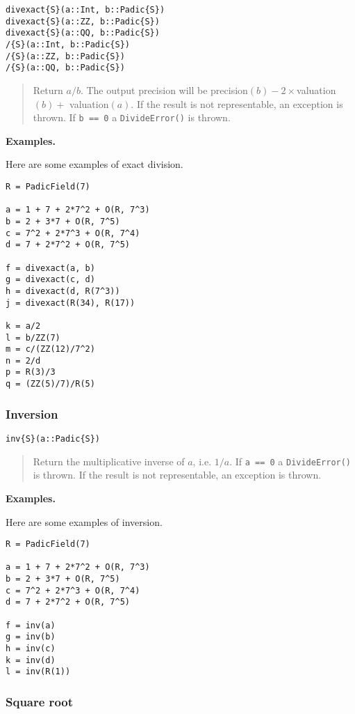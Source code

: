 \documentclass[a4paper,10pt]{article}
\newcommand{\code}{\lstinline}
\newcommand{\desc}[1]{\vspace{-3mm}\begin{quote}#1\end{quote}}
\begin{document}
{{\begin{lstlisting}
divexact{S}(a::Int, b::Padic{S})
divexact{S}(a::ZZ, b::Padic{S})
divexact{S}(a::QQ, b::Padic{S})
/{S}(a::Int, b::Padic{S})
/{S}(a::ZZ, b::Padic{S})
/{S}(a::QQ, b::Padic{S})
\end{lstlisting}

\desc{Return $a/b$. The output precision will be 
precision$(b) - 2\times$valuation$(b) +$ valuation$(a)$. If the result is not
representable, an exception is thrown. If \code{b == 0} a \code{DivideError()}
is thrown.}

\textbf{Examples.}

Here are some examples of exact division.

\begin{lstlisting}
R = PadicField(7)

a = 1 + 7 + 2*7^2 + O(R, 7^3)
b = 2 + 3*7 + O(R, 7^5)
c = 7^2 + 2*7^3 + O(R, 7^4)
d = 7 + 2*7^2 + O(R, 7^5)

f = divexact(a, b)
g = divexact(c, d)
h = divexact(d, R(7^3))
j = divexact(R(34), R(17))

k = a/2
l = b/ZZ(7)
m = c/(ZZ(12)/7^2)
n = 2/d
p = R(3)/3
q = (ZZ(5)/7)/R(5)
\end{lstlisting}

\subsubsection{Inversion}

\begin{lstlisting}
inv{S}(a::Padic{S})
\end{lstlisting}

\desc{Return the multiplicative inverse of $a$, i.e. $1/a$. If \code{a == 0}
a \code{DivideError()} is thrown. If the result is not representable, an
exception is thrown.}

\textbf{Examples.}

Here are some examples of inversion.

\begin{lstlisting}
R = PadicField(7)

a = 1 + 7 + 2*7^2 + O(R, 7^3)
b = 2 + 3*7 + O(R, 7^5)
c = 7^2 + 2*7^3 + O(R, 7^4)
d = 7 + 2*7^2 + O(R, 7^5)

f = inv(a)
g = inv(b)
h = inv(c)
k = inv(d)
l = inv(R(1))
\end{lstlisting}

\subsubsection{Square root}

}}
\end{document}
